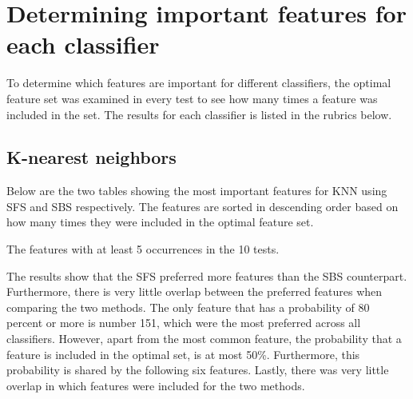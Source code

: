 \documentclass{kththesis}
\begin{document}
\section{Determining important features for each classifier}

To determine which features are important for different classifiers, the optimal feature set was examined in every test to see how many times a feature was included in the set. The results for each classifier is listed in the rubrics below.

\subsection{K-nearest neighbors}

Below are the two tables showing the most important features for KNN using SFS and SBS respectively. The features are sorted in descending order based on how many times they were included in the optimal feature set.

\begin{table}[h!]
  \begin{center}
    \caption{The features with at least 5 occurrences in the 10 tests.}
  \end{center}
\end{table}

\newpage

The results show that the SFS preferred more features than the SBS counterpart. Furthermore, there is very little overlap between the preferred features when comparing the two methods. The only feature that has a probability of 80 percent or more is number 151, which were the most preferred across all classifiers. However, apart from the most common feature, the probability that a feature is included in the optimal set, is at most 50\%. Furthermore, this probability is shared by the following six features. Lastly, there was very little overlap in which features were included for the two methods.
\end{document}
